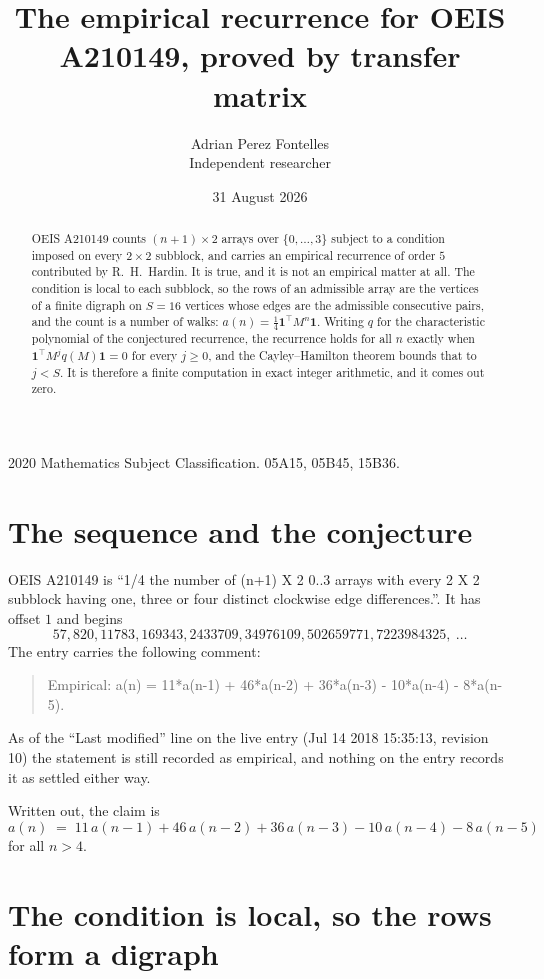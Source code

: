 \documentclass[11pt,a4paper]{article}
\title{The empirical recurrence for OEIS A210149, proved by transfer matrix}
\author{Adrian Perez Fontelles\\ \small Independent researcher}
\date{31 August 2026}
\theoremstyle{plain}
\theoremstyle{definition}
\begin{document}
\maketitle

\begin{abstract}
OEIS A210149 counts $(n+1)\times2$ arrays over $\{0,\dots,3\}$ subject to a condition imposed on
every $2\times2$ subblock, and carries an empirical recurrence of order $5$ contributed
by R.~H.~Hardin. It is true, and it is not an empirical matter at all. The condition is local
to each subblock, so the rows of an admissible array are the vertices of a finite digraph
on $S=16$ vertices whose edges are the admissible consecutive pairs, and the count is a
number of walks: $a(n)=\tfrac1{4}\mathbf{1}^{\!\top}M^{n}\mathbf{1}$. Writing $q$
for the characteristic polynomial of the conjectured recurrence, the recurrence holds for all
$n$ exactly when $\mathbf{1}^{\!\top}M^{j}q(M)\mathbf{1}=0$ for every $j\ge0$, and the
Cayley--Hamilton theorem bounds that to $j<S$. It is therefore a finite computation in exact
integer arithmetic, and it comes out zero.
\end{abstract}

\noindent\small 2020 Mathematics Subject Classification. 05A15, 05B45, 15B36.\normalsize

\section{The sequence and the conjecture}

OEIS A210149 is ``1/4 the number of (n+1) X 2 0..3 arrays with every 2 X 2 subblock having one, three or four distinct clockwise edge differences.''. It has offset $1$ and begins
\[
57, 820, 11783, 169343, 2433709, 34976109, 502659771, 7223984325,\ \dots
\]
The entry carries the following comment:
\begin{quote}\small
Empirical: a(n) = 11*a(n-1) + 46*a(n-2) + 36*a(n-3) - 10*a(n-4) - 8*a(n-5).
\end{quote}
As of the ``Last modified'' line on the live entry (Jul 14 2018 15:35:13, revision 10) the statement is
still recorded as empirical, and nothing on the entry records it as settled either way.

Written out, the claim is
\begin{equation}\label{eq:conj}
a(n)\;=\;11\,a(n-1) + 46\,a(n-2) + 36\,a(n-3) - 10\,a(n-4) - 8\,a(n-5)
\end{equation}
for all $n>4$.

\section{The condition is local, so the rows form a digraph}
\end{document}
